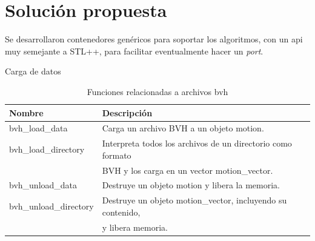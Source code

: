 \documentclass{beamer} %
\newcommand{\mono}[1]{{\ttfamily #1}}
\begin{document}
\section{Solución propuesta}

\begin{frame}
    \begin{block}{}
        Se desarrollaron contenedores genéricos para soportar los algoritmos, con un api muy semejante a STL++, para facilitar eventualmente hacer un \emph{port}.
    \end{block}
\end{frame}

\begin{frame}{Carga de datos}
\begin{table}
    \centering
    \caption{Funciones relacionadas a archivos bvh}
    \label{tab:bvh}
    \scriptsize 
    \begin{tabular}{ll}
        \toprule
        Nombre & Descripción \\
        \midrule
        \mono{bvh\_load\_data} & Carga un archivo BVH a un objeto \mono{motion}. \\
        \mono{bvh\_load\_directory} & Interpreta todos los archivos de un directorio como formato \\ & BVH y los carga en un vector \mono{motion\_vector}. \\
        \mono{bvh\_unload\_data} & Destruye un objeto \mono{motion} y libera la memoria. \\
        \mono{bvh\_unload\_directory} & Destruye un objeto \mono{motion\_vector}, incluyendo su contenido, \\ & y libera memoria. \\
        \bottomrule
    \end{tabular}
\end{table}
\end{frame}
\end{document}
